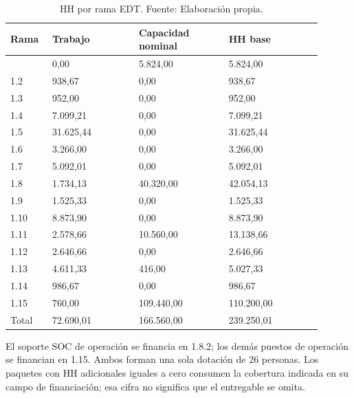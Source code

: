 \documentclass[11pt]{article}
\begin{document}
\begingroup
\small
\begin{longtable}{@{}p{0.12\linewidth}p{0.25\linewidth}p{0.26\linewidth}p{0.27\linewidth}@{}}
\caption[HH por rama EDT]{HH por rama EDT. Fuente: Elaboración propia.}\label{tab:t15-4}\\
\toprule
\textbf{Rama} & \textbf{Trabajo} & \textbf{Capacidad nominal} & \textbf{HH base} \\
\midrule
\endhead
\bottomrule
\endlastfoot
1.1 & 0,00 & 5.824,00 & 5.824,00 \\
1.2 & 938,67 & 0,00 & 938,67 \\
1.3 & 952,00 & 0,00 & 952,00 \\
1.4 & 7.099,21 & 0,00 & 7.099,21 \\
1.5 & 31.625,44 & 0,00 & 31.625,44 \\
1.6 & 3.266,00 & 0,00 & 3.266,00 \\
1.7 & 5.092,01 & 0,00 & 5.092,01 \\
1.8 & 1.734,13 & 40.320,00 & 42.054,13 \\
1.9 & 1.525,33 & 0,00 & 1.525,33 \\
1.10 & 8.873,90 & 0,00 & 8.873,90 \\
1.11 & 2.578,66 & 10.560,00 & 13.138,66 \\
1.12 & 2.646,66 & 0,00 & 2.646,66 \\
1.13 & 4.611,33 & 416,00 & 5.027,33 \\
1.14 & 986,67 & 0,00 & 986,67 \\
1.15 & 760,00 & 109.440,00 & 110.200,00 \\
Total & 72.690,01 & 166.560,00 & 239.250,01 \\
\end{longtable}
\endgroup

El soporte SOC de operación se financia en 1.8.2; los demás puestos de operación se financian en 1.15. Ambos forman una sola dotación de 26 personas. Los paquetes con HH adicionales iguales a cero consumen la cobertura indicada en su campo de financiación; esa cifra no significa que el entregable se omita.
\end{document}
